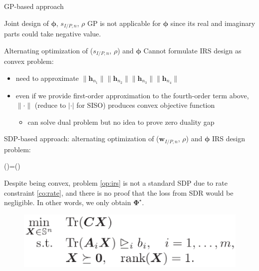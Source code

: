 \documentclass[9pt]{beamer}
\begin{document}
\begin{frame}{GP-based approach}
    \begin{block}{Joint design of $\boldsymbol{\phi}$, $s_{I/P,n}$, $\rho$}
        GP is not applicable for $\boldsymbol{\phi}$ since its real and imaginary parts could take negative value.
    \end{block}
    \vspace{1em}
    \begin{block}{Alternating optimization of ($s_{I/P,n}$, $\rho$) and $\boldsymbol{\phi}$}
        Cannot formulate IRS design as convex problem:
        \begin{itemize}
            \item need to approximate $\lVert{\boldsymbol{h}_{{n_1}}}\rVert \lVert{\boldsymbol{h}_{{n_2}}}\rVert \lVert{\boldsymbol{h}_{{n_3}}}\rVert \lVert{\boldsymbol{h}_{{n_4}}}\rVert$
            \item even if we provide first-order approximation to the fourth-order term above, $\lVert{\cdot}\rVert$ (reduce to $\lvert{\cdot}\rvert$ for SISO) produces convex objective function
            \begin{itemize}
                \item can solve dual problem but no idea to prove zero duality gap
            \end{itemize}
        \end{itemize}
    \end{block}
\end{frame}

\begin{frame}{SDP-based approach: alternating optimization of ($\boldsymbol{w}_{I/P,n}$, $\rho$) and $\boldsymbol{\phi}$}
    IRS design problem:
    \begin{maxi!}
        {\boldsymbol{\boldsymbol{\Phi}}}{(\boldsymbol{\Phi})=(\boldsymbol{\Phi})}{\label{op:irs}}{}
    \end{maxi!}
    Despite being convex, problem \ref{op:irs} is not a standard SDP due to rate constraint \ref{co:rate}, and there is no proof that the loss from SDR would be negligible. In other words, we only obtain $\boldsymbol{\Phi}^{\star}$.
    \begin{figure}
        \centering
        \includegraphics[width=0.5\linewidth]{assets/sdp.eps}
    \end{figure}
\end{frame}
\end{document}
